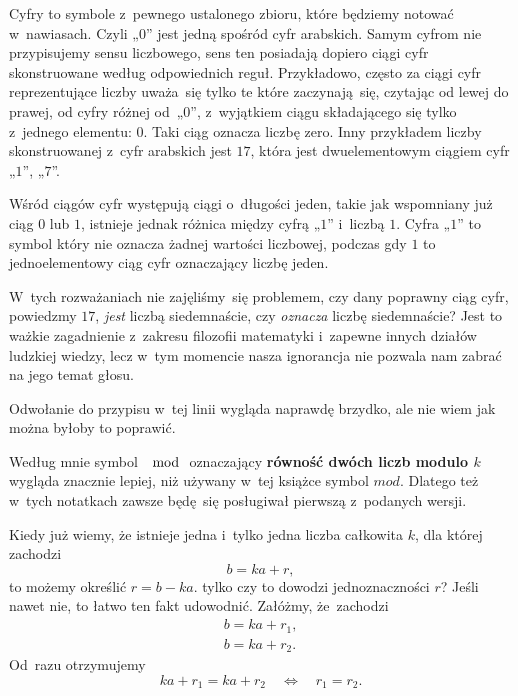 \documentclass[a4paper,11pt]{article}
\numberwithin{equation}{section}
\begin{document}
Cyfry to symbole z~pewnego ustalonego zbioru, które będziemy notować
w~nawiasach. Czyli „$0$” jest jedną spośród cyfr arabskich. Samym cyfrom
nie przypisujemy sensu liczbowego, sens ten posiadają dopiero ciągi cyfr
skonstruowane według odpowiednich reguł. Przykładowo, często za ciągi cyfr
reprezentujące liczby uważa~się tylko te które zaczynają~się, czytając od
lewej do prawej, od cyfry różnej od~„$0$”, z~wyjątkiem ciągu składającego
się tylko z~jednego elementu: $0$. Taki ciąg oznacza liczbę zero. Inny
przykładem liczby skonstruowanej z~cyfr arabskich jest $17$, która
jest dwuelementowym ciągiem cyfr „$1$”, „$7$”.

Wśród ciągów cyfr występują ciągi o~długości jeden, takie jak wspomniany już
ciąg $0$ lub $1$, istnieje jednak różnica między cyfrą „$1$” i~liczbą $1$.
Cyfra „$1$” to symbol który nie oznacza żadnej wartości liczbowej, podczas
gdy $1$ to jednoelementowy ciąg cyfr oznaczający liczbę jeden.

W~tych rozważaniach nie zajęliśmy~się problemem, czy dany poprawny ciąg
cyfr, powiedzmy $17$, \textit{jest} liczbą siedemnaście, czy
\textit{oznacza} liczbę siedemnaście? Jest to ważkie zagadnienie z~zakresu
filozofii matematyki i~zapewne innych działów ludzkiej wiedzy, lecz w~tym
momencie nasza ignorancja nie pozwala nam zabrać na jego temat głosu.

\VerSpaceFour





\noindent
{} Odwołanie do przypisu w~tej linii wygląda naprawdę
brzydko, ale nie wiem jak można byłoby to poprawić.

\VerSpaceFour





\noindent
{} Według mnie symbol $\mod$ oznaczający \textbf{równość dwóch liczb
  modulo $k$} wygląda znacznie lepiej, niż używany w~tej książce symbol
$mod$. Dlatego też w~tych notatkach zawsze będę~się posługiwał pierwszą
z~podanych wersji.

\VerSpaceFour





\noindent
{} Kiedy już wiemy, że istnieje jedna i~tylko jedna liczba całkowita
$k$, dla której zachodzi
\begin{equation}
  \label{eq:Gancarzewicz-Arytmetyka-04}
  b = k a + r,
\end{equation}
to możemy określić $r = b - k a$. tylko czy to dowodzi jednoznaczności $r$?
Jeśli nawet nie, to łatwo ten fakt udowodnić. Załóżmy, że~zachodzi
\begin{subequations}
  \begin{align}
    \label{eq:Gancarzewicz-Arytmetyka-05-A}
    b = k a + r_{ 1 }, \\
    \label{eq:Gancarzewicz-Arytmetyka-05-B}
    b = k a + r_{ 2 }.
  \end{align}
\end{subequations}
Od~razu otrzymujemy
\begin{equation}
  \label{eq:Gancarzewicz-Arytmetyka-06}
  k a + r_{ 1 } = k a + r_{ 2 } \quad \iff \quad r_{ 1 } = r_{ 2 }.
\end{equation}
\end{document}
